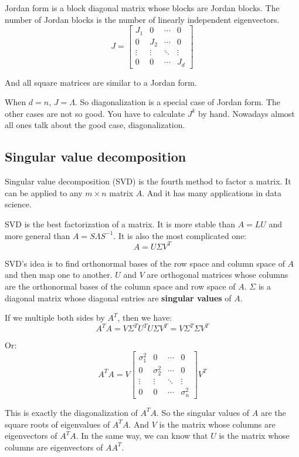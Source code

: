\documentclass[12pt]{ctexart}
\begin{document}
Jordan form is a block diagonal matrix whose blocks are Jordan blocks. The number of
Jordan blocks is the number of linearly independent eigenvectors.
\[
  J = \begin{bmatrix}
    J_1 & 0 & \cdots & 0 \\
    0 & J_2 & \cdots & 0 \\
    \vdots & \vdots & \ddots & \vdots \\
    0 & 0 & \cdots & J_d
  \end{bmatrix}
\]

And all square matrices are similar to a Jordan form.

When $d = n$, $J = \Lambda$. So diagonalization is a special case of Jordan form. The
other cases are not so good. You have to calculate $J^k$ by hand. Nowadays almost all
ones talk about the good case, diagonalization.

\subsection{\textbf{Singular value decomposition}}

Singular value decomposition (SVD) is the fourth method to factor a matrix. It can be
applied to any $m \times n$ matrix $A$. And it has many applications in data science.

SVD is the best factorization of a matrix. It is more stable than $A = LU$ and more general
than $A = S\Lambda S^{-1}$. It is also the most complicated one:
\[
  A = U\Sigma V^{T}
\]

SVD's idea is to find orthonormal bases of the row space and column space of $A$ and
then map one to another. $U$ and $V$ are orthogonal matrices whose columns are the
orthonormal bases of the column space and row space of $A$. $\Sigma$ is a diagonal
matrix whose diagonal entries are \textbf{singular values} of $A$.

If we multiple both sides by $A^{T}$, then we have:
\[
  A^{T}A = V\Sigma^{T}U^{T}U\Sigma V^{T} = V\Sigma^{T}\Sigma V^{T}
\]

Or:
\[
  A^{T}A = V \begin{bmatrix}
    \sigma_1^2 & 0 & \cdots & 0 \\
    0 & \sigma_2^2 & \cdots & 0 \\
    \vdots & \vdots & \ddots & \vdots \\
    0 & 0 & \cdots & \sigma_n^2
  \end{bmatrix} V^{T}
\]

This is exactly the diagonalization of $A^{T}A$. So the singular values of $A$ are the
square roots of eigenvalues of $A^{T}A$. And $V$ is the matrix whose columns are
eigenvectors of $A^{T}A$. In the same way, we can know that $U$ is the matrix whose columns
are eigenvectors of $AA^{T}$.
\end{document}
